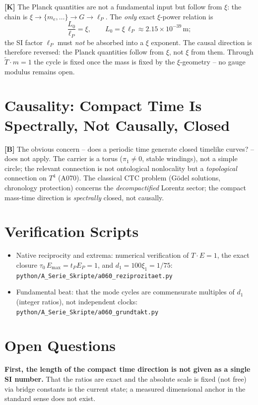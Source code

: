 \textbf{[K]} The Planck quantities are not a fundamental input but follow from
$\xi$: the chain is $\xi\to\{m_e,\dots\}\to G\to\ell_P$. The \emph{only} exact
$\xi$-power relation is
\[
  \frac{L_0}{\ell_P} = \xi,\qquad L_0 = \xi\,\ell_P \approx 2{.}15\times10^{-39}\,\text{m};
\]
the SI factor $\ell_P$ must \emph{not} be absorbed into a $\xi$ exponent. The
causal direction is therefore reversed: the Planck quantities follow from $\xi$,
not $\xi$ from them. Through $\tilde T\cdot m=1$ the cycle is fixed once the
mass is fixed by the $\xi$-geometry -- no gauge modulus remains open.

\section{Causality: Compact Time Is Spectrally, Not Causally, Closed}

\textbf{[B]} The obvious concern -- does a periodic time generate closed timelike
curves? -- does not apply. The carrier is a torus ($\pi_1\neq0$, stable windings),
not a simple circle; the relevant connection is not ontological nonlocality but a
\emph{topological} connection on $T^4$ (A070). The classical CTC problem (Gödel
solutions, chronology protection) concerns the \emph{decompactified} Lorentz
sector; the compact mass-time direction is \emph{spectrally} closed, not causally.

\section{Verification Scripts}

\begin{itemize}[leftmargin=2em,itemsep=2pt,topsep=2pt]
  \item Native reciprocity and extrema: numerical verification of $T\cdot E=1$,
    the exact closure $\tau_0\,E_\text{max}=t_P E_P=1$, and $d_1=100\xi_1=1/75$:
    \texttt{python/A\_Serie\_Skripte/a060\_reziprozitaet.py}
  \item Fundamental beat: that the mode cycles are commensurate multiples of
    $d_1$ (integer ratios), not independent clocks:
    \texttt{python/A\_Serie\_Skripte/a060\_grundtakt.py}
\end{itemize}

\section{Open Questions}

\textbf{First, the length of the compact time direction is not given as a single
SI number.} That the ratios are exact and the absolute scale is fixed (not free)
via bridge constants is the current state; a measured dimensional anchor in the
standard sense does not exist.

